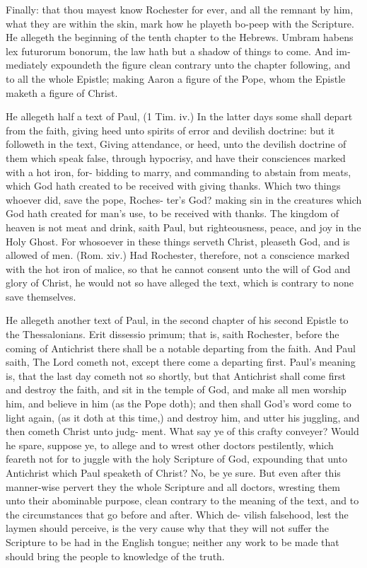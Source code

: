 \documentclass{custom}
\begin{document}
Finally: that thou mayest know Rochester for ever, 
and all the remnant by him, what they are within the 
skin, mark how he playeth bo-peep with the Scripture. 
He allegeth the beginning of the tenth chapter to the 
Hebrews. Umbram habens lex futurorum bonorum, 
the law hath but a shadow of things to come. And im- 
mediately expoundeth the figure clean contrary unto the 
chapter following, and to all the whole Epistle; making 
Aaron a figure of the Pope, whom the Epistle maketh a 
figure of Christ. 

He allegeth half a text of Paul, (1 Tim. iv.) In the 
latter days some shall depart from the faith, giving heed 
unto spirits of error and devilish doctrine: but it followeth 
in the text, Giving attendance, or heed, unto the devilish 
doctrine of them which speak false, through hypocrisy, 
and have their consciences marked with a hot iron, for- 
bidding to marry, and commanding to abstain from meats, 
which God hath created to be received with giving thanks. 
Which two things whoever did, save the pope, Roches-
ter's God? making sin in the creatures which God hath 
created for man's use, to be received with thanks. The 
kingdom of heaven is not meat and drink, saith Paul, but 
righteousness, peace, and joy in the Holy Ghost. For 
whosoever in these things serveth Christ, pleaseth God, 
and is allowed of men. (Rom. xiv.) Had Rochester, 
therefore, not a conscience marked with the hot iron of 
malice, so that he cannot consent unto the will of God 
and glory of Christ, he would not so have alleged the 
text, which is contrary to none save themselves. 

He allegeth another text of Paul, in the second chapter 
of his second Epistle to the Thessalonians. Erit dissessio 
primum; that is, saith Rochester, before the coming of 
Antichrist there shall be a notable departing from the 
faith. And Paul saith, The Lord cometh not, except 
there come a departing first. Paul's meaning is, that the 
last day cometh not so shortly, but that Antichrist shall 
come first and destroy the faith, and sit in the temple of 
God, and make all men worship him, and believe in him 
(as the Pope doth); and then shall God's word come to 
light again, (as it doth at this time,) and destroy him, and 
utter his juggling, and then cometh Christ unto judg- 
ment. What say ye of this crafty conveyer? Would he 
spare, suppose ye, to allege and to wrest other doctors 
pestilently, which feareth not for to juggle with the holy 
Scripture of God, expounding that unto Antichrist which 
Paul speaketh of Christ? No, be ye sure. But even 
after this manner-wise pervert they the whole Scripture 
and all doctors, wresting them unto their abominable 
purpose, clean contrary to the meaning of the text, and to 
the circumstances that go before and after. Which de- 
vilish falsehood, lest the laymen should perceive, is the 
very cause why that they will not suffer the Scripture to be
had in the English tongue; neither any work to be made
that should bring the people to knowledge of the 
truth. 
\end{document}
